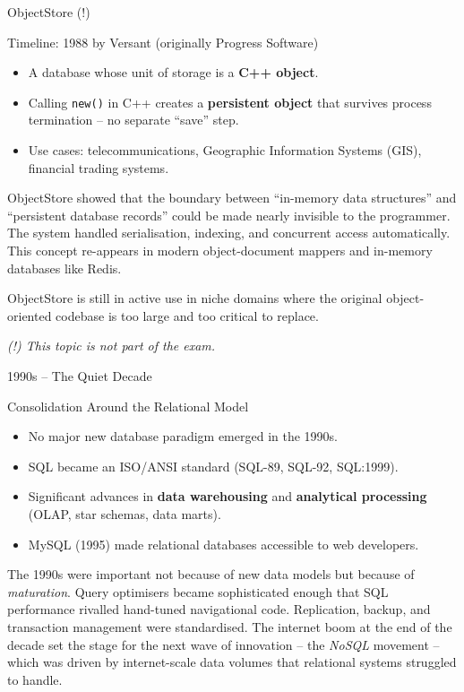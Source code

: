 \begin{frame}{ObjectStore (!)}
  \begin{block}{Timeline: 1988 by Versant (originally Progress Software)}
    \begin{itemize}
      \item A database whose unit of storage is a \textbf{C++ object}.
      \item Calling \texttt{new()} in C++ creates a \textbf{persistent object}
            that survives process termination -- no separate ``save'' step.
      \item Use cases: telecommunications, Geographic Information Systems (GIS),
            financial trading systems.
    \end{itemize}
  \end{block}

  ObjectStore showed that the boundary between ``in-memory data structures''
  and ``persistent database records'' could be made nearly invisible to the
  programmer.  The system handled serialisation, indexing, and concurrent
  access automatically.  This concept re-appears in modern object-document
  mappers and in-memory databases like Redis.

  \medskip
  ObjectStore is still in active use in niche domains where the original
  object-oriented codebase is too large and too critical to replace.

  \smallskip
  \textit{(!) This topic is not part of the exam.}
\end{frame}

\begin{frame}{1990s -- The Quiet Decade}
  \begin{block}{Consolidation Around the Relational Model}
    \begin{itemize}
      \item No major new database paradigm emerged in the 1990s.
      \item SQL became an ISO/ANSI standard (SQL-89, SQL-92, SQL:1999).
      \item Significant advances in \textbf{data warehousing} and
            \textbf{analytical processing} (OLAP, star schemas, data marts).
      \item MySQL (1995) made relational databases accessible to web developers.
    \end{itemize}
  \end{block}

  The 1990s were important not because of new data models but because of
  \emph{maturation}.  Query optimisers became sophisticated enough that SQL
  performance rivalled hand-tuned navigational code.  Replication, backup,
  and transaction management were standardised.  The internet boom at the end
  of the decade set the stage for the next wave of innovation -- the
  \emph{NoSQL} movement -- which was driven by internet-scale data volumes
  that relational systems struggled to handle.
\end{frame}

